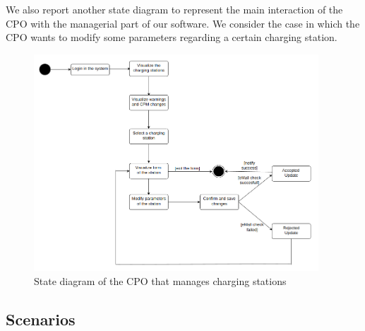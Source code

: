 We also report another state diagram to represent the main interaction of the CPO with the managerial part of our software. We consider the case in which the CPO wants to modify some parameters regarding a certain charging station. 

\begin{figure}[H]
    \centering
    \includegraphics[width=0.95\textwidth]{Images/CPOparams.png}
    \caption{State diagram of the CPO that manages charging stations}
\end{figure}

\subsection{Scenarios}
